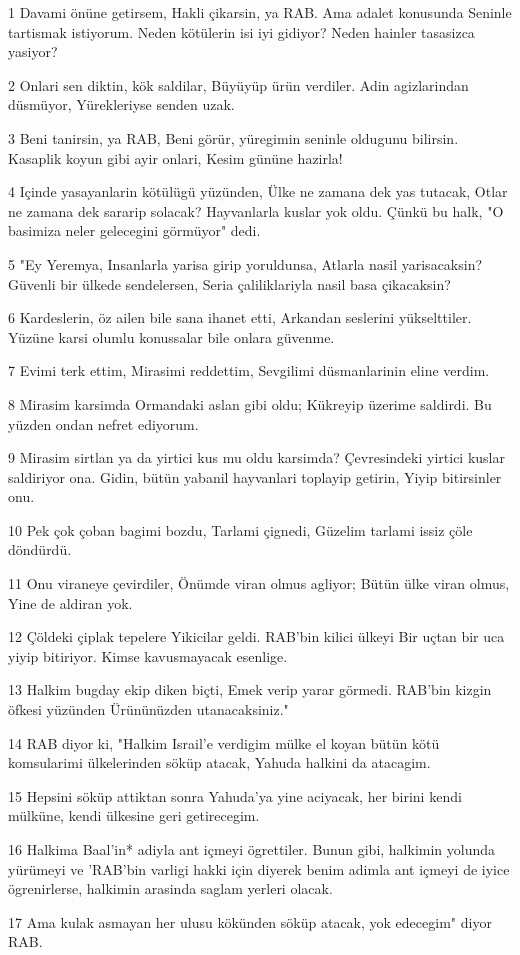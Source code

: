 \par 1 Davami önüne getirsem, Hakli çikarsin, ya RAB. Ama adalet konusunda Seninle tartismak istiyorum. Neden kötülerin isi iyi gidiyor? Neden hainler tasasizca yasiyor?
\par 2 Onlari sen diktin, kök saldilar, Büyüyüp ürün verdiler. Adin agizlarindan düsmüyor, Yürekleriyse senden uzak.
\par 3 Beni tanirsin, ya RAB, Beni görür, yüregimin seninle oldugunu bilirsin. Kasaplik koyun gibi ayir onlari, Kesim gününe hazirla!
\par 4 Içinde yasayanlarin kötülügü yüzünden, Ülke ne zamana dek yas tutacak, Otlar ne zamana dek sararip solacak? Hayvanlarla kuslar yok oldu. Çünkü bu halk, "O basimiza neler gelecegini görmüyor" dedi.
\par 5 "Ey Yeremya, Insanlarla yarisa girip yoruldunsa, Atlarla nasil yarisacaksin? Güvenli bir ülkede sendelersen, Seria çaliliklariyla nasil basa çikacaksin?
\par 6 Kardeslerin, öz ailen bile sana ihanet etti, Arkandan seslerini yükselttiler. Yüzüne karsi olumlu konussalar bile onlara güvenme.
\par 7 Evimi terk ettim, Mirasimi reddettim, Sevgilimi düsmanlarinin eline verdim.
\par 8 Mirasim karsimda Ormandaki aslan gibi oldu; Kükreyip üzerime saldirdi. Bu yüzden ondan nefret ediyorum.
\par 9 Mirasim sirtlan ya da yirtici kus mu oldu karsimda? Çevresindeki yirtici kuslar saldiriyor ona. Gidin, bütün yabanil hayvanlari toplayip getirin, Yiyip bitirsinler onu.
\par 10 Pek çok çoban bagimi bozdu, Tarlami çignedi, Güzelim tarlami issiz çöle döndürdü.
\par 11 Onu viraneye çevirdiler, Önümde viran olmus agliyor; Bütün ülke viran olmus, Yine de aldiran yok.
\par 12 Çöldeki çiplak tepelere Yikicilar geldi. RAB'bin kilici ülkeyi Bir uçtan bir uca yiyip bitiriyor. Kimse kavusmayacak esenlige.
\par 13 Halkim bugday ekip diken biçti, Emek verip yarar görmedi. RAB'bin kizgin öfkesi yüzünden Ürününüzden utanacaksiniz."
\par 14 RAB diyor ki, "Halkim Israil'e verdigim mülke el koyan bütün kötü komsularimi ülkelerinden söküp atacak, Yahuda halkini da atacagim.
\par 15 Hepsini söküp attiktan sonra Yahuda'ya yine aciyacak, her birini kendi mülküne, kendi ülkesine geri getirecegim.
\par 16 Halkima Baal'in* adiyla ant içmeyi ögrettiler. Bunun gibi, halkimin yolunda yürümeyi ve 'RAB'bin varligi hakki için diyerek benim adimla ant içmeyi de iyice ögrenirlerse, halkimin arasinda saglam yerleri olacak.
\par 17 Ama kulak asmayan her ulusu kökünden söküp atacak, yok edecegim" diyor RAB.

